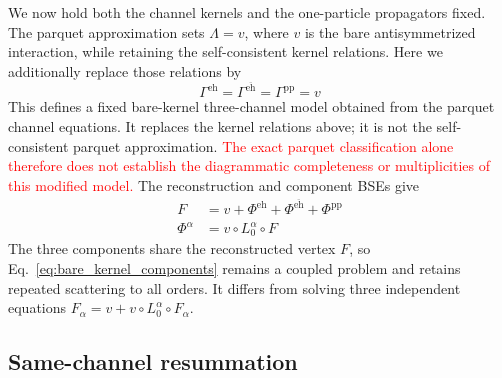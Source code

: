 \documentclass[aip,jcp,reprint,noshowkeys,superscriptaddress]{revtex4-1}
\newcommand{\titou}[1]{\textcolor{red}{#1}}
\newcommand{\eh}{\text{eh}}
\newcommand{\teh}{{\overline{\text{eh}}}}
\newcommand{\pp}{\text{pp}}
\begin{document}
We now hold both the channel kernels and the one-particle propagators fixed.
The parquet approximation sets $\Lambda=v$, where $v$ is the bare
antisymmetrized interaction, while retaining the self-consistent kernel
relations. Here we additionally replace those relations by
\begin{equation}
    \Gamma^{\eh}=\Gamma^{\teh}=\Gamma^{\pp}=v
    \label{eq:bare_channel_kernels}
\end{equation}
This defines a fixed bare-kernel three-channel model obtained from the
parquet channel equations. It replaces the kernel
relations above; it is not the self-consistent parquet approximation.
\titou{The exact parquet classification alone therefore does not establish the
diagrammatic completeness or multiplicities of this modified model.}
The reconstruction and component BSEs give
\begin{equation}
 \begin{aligned}
    F&=v+\Phi^{\eh}+\Phi^{\teh}+\Phi^{\pp}
    \\
    \Phi^{\alpha}&=v\circ L_0^{\alpha}\circ F
 \end{aligned}
 \label{eq:bare_kernel_components}
\end{equation}
The three components share the reconstructed vertex $F$, so
Eq.~\eqref{eq:bare_kernel_components} remains a coupled problem and retains
repeated scattering to all orders. It differs from solving three independent
equations $F_{\alpha}=v+v\circ L_0^{\alpha}\circ F_{\alpha}$.

\subsection{Same-channel resummation}
\label{sec:faddeev_rearrangement}
\end{document}
